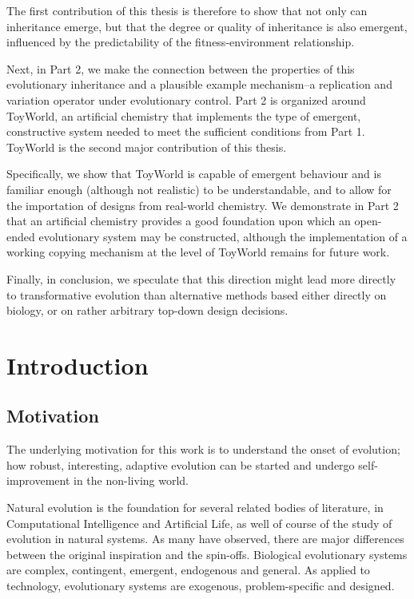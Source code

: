 \documentclass[]{report}
\begin{document}
The first contribution of this thesis is therefore to show that not only can inheritance emerge, but that the degree or quality of inheritance is also emergent, influenced by the predictability of the fitness-environment relationship. 

Next, in Part 2, we make the connection between the properties of this evolutionary inheritance and a plausible example mechanism--a replication and variation operator under evolutionary control. Part 2 is organized around ToyWorld, an artificial chemistry that implements the type of emergent, constructive system needed to meet the sufficient conditions from Part 1. ToyWorld is the second major contribution of this thesis.

Specifically, we show that ToyWorld is capable of emergent behaviour and is familiar enough (although not realistic) to be understandable, and to allow for the importation of designs from real-world chemistry. We demonstrate in Part 2 that an artificial chemistry provides a good foundation upon which an open-ended evolutionary system may be constructed, although the implementation of a working copying mechanism at the level of ToyWorld remains for future work.

Finally, in conclusion, we speculate that this direction might lead more directly to transformative evolution than alternative methods based either directly on biology, or on rather arbitrary top-down design decisions.

\chapter{Introduction}

\section{Motivation}
The underlying motivation for this work is to understand the onset of evolution; how robust, interesting, adaptive evolution can be started and undergo self-improvement in the non-living world.

Natural evolution is the foundation for several related bodies of literature, in Computational Intelligence and Artificial Life, as well of course of the study of evolution in natural systems. As many have observed, there are major differences between the original inspiration and the spin-offs. Biological evolutionary systems are complex, contingent, emergent, endogenous and general. As applied to technology, evolutionary systems are exogenous, problem-specific and designed.
\end{document}

